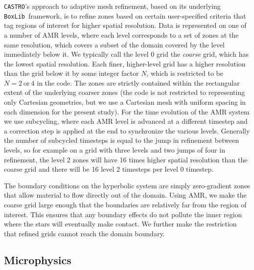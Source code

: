 \documentclass[iop]{../emulateapj}
\newcommand{\boxlib}{\texttt{BoxLib}}
\newcommand{\castro}{\texttt{CASTRO}}
\begin{document}
\castro's approach to adaptive mesh refinement, based on its underlying
\boxlib\ framework, is to refine zones based on certain user-specified
criteria that tag regions of interest for higher spatial
resolution. Data is represented on one of a number of AMR levels,
where each level corresponds to a set of zones at the same resolution,
which covers a subset of the domain covered by the level immediately
below it. We typically call the level 0 grid the \textit{coarse} grid,
which has the lowest spatial resolution. Each finer, higher-level grid
has a higher resolution than the grid below it by some integer factor
$N$, which is restricted to be $N = 2\ \text{or}\ 4$ in the code. The
zones are strictly contained within the rectangular extent of the
underlying coarser zones (the code is not restricted to representing
only Cartesian geometries, but we use a Cartesian mesh with uniform
spacing in each dimension for the present study). For the time
evolution of the AMR system we use subcycling, where each AMR level is
advanced at a different timestep and a correction step is applied at
the end to synchronize the various levels. Generally the number of
subcycled timesteps is equal to the jump in refinement between levels,
so for example on a grid with three levels and two jumps of four in
refinement, the level 2 zones will have 16 times higher spatial
resolution than the coarse grid and there will be 16 level 2 timesteps
per level 0 timestep.

The boundary conditions on the hyperbolic system are simply
zero-gradient zones that allow material to flow directly out of the
domain. Using AMR, we make the coarse grid large enough that the
boundaries are relatively far from the region of interest. This
ensures that any boundary effects do not pollute the inner region
where the stars will eventually make contact.  We further make the
restriction that refined grids cannot reach the domain boundary.

\subsection{Microphysics}
\end{document}
